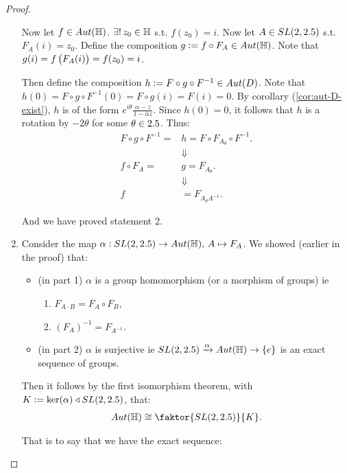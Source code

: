 \begin{proof}
\begin{enumerate}
Now let $f \in Aut ( \mathbb{H})$. $\exists !  \, z_0 \in \mathbb{H}$ s.t. $f(z_0) = i$. Now let $A \in SL(2,2.5) $ s.t. $F_A (i) = z_0$. Define the composition $g \vcentcolon = f \circ F_A  \in Aut ( \mathbb{H})$. Note that $g(i) = f \left( F_A ( i)  \right) = f(z_0) = i$.

Then define the composition $h \vcentcolon = F \circ g \circ F^{-1} \in Aut (D)$. Note that $h(0) = F \circ g \circ F^{-1} (0) = F \circ g (i) = F (i) = 0$. By corollary (\ref{cor:aut-D-exist}), $h$ is of the form $e^{i \theta} \frac{\alpha - z}{1 - \overline{\alpha } z}$. Since $h(0) = 0$, it follows that $h$ is a rotation by $-2 \theta$ for some $\theta \in 2.5$. Thus:
\begin{align*}
F \circ g \circ F^{-1} = &h = F \circ F_{A_\theta} \circ F^{-1}.\\
&\Downarrow\\
f \circ F_A = &g = F_{A_\theta}.\\
&\Downarrow\\
f &= F_{A_\theta A^{-1}}.
\end{align*}

And we have proved statement 2.


    \item Consider the map $\alpha : SL(2, 2.5) \to Aut ( \mathbb{H}), \, A \mapsto F_A$. We showed (earlier in the proof) that:
    \begin{itemize}
        \item (in part 1) $\alpha$ is a group homomorphism (or a morphism of groups) ie
        \begin{enumerate}
            \item $F_{A \cdot B} = F_A \circ F_B$,
            \item $(F_A)^{-1} = F_{A^{-1}}$.
        \end{enumerate}
        \item (in part 2) $\alpha$ is surjective ie $SL(2, 2.5) \xrightarrow[]{\alpha} Aut ( \mathbb{H}) \to \{ e \}$ is an exact sequence of groups.
    \end{itemize}
    
    Then it follows by the first isomorphism theorem, with $K \vcentcolon = \ker(\alpha) \triangleleft SL(2,2.5)$, that:
    \begin{align*}
        Aut(\HH) \cong  \faktor{SL(2,\R)}{K}.
    \end{align*}
    
    That is to say that we have the exact sequence:

    \begin{center}
    \end{center}
    

\end{enumerate}
\end{proof}
